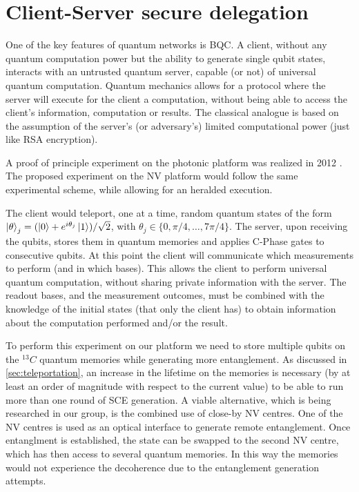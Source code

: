 \documentclass[a4paper, twoside]{article}
\begin{document}
\section{Client-Server secure delegation}
\label{sec:delegation}

One of the key features of quantum networks is \ac{BQC}. A client, without any quantum computation power but the ability to generate single qubit states, interacts with an untrusted quantum server, capable (or not) of universal quantum computation. Quantum mechanics allows for a protocol where the server will execute for the client a computation, without being able to access the client's information, computation or results. The classical analogue is based on the assumption of the server's (or adversary's) limited computational power (just like RSA encryption).

A proof of principle experiment on the photonic platform was realized in 2012 \cite{Barz2012}. The proposed experiment on the NV platform would follow the same experimental scheme, while allowing for an heralded execution.

The client would teleport, one at a time, random quantum states of the form $\ket\theta_j = (\ket 0 + e^{i \theta_j}\ket 1)/\sqrt 2$, with $\theta_j \in \lbrace0, \pi/4,\ldots,7\pi/4\rbrace$. The server, upon receiving the qubits, stores them in quantum memories and applies C-Phase gates to consecutive qubits.
At this point the client will communicate which measurements to perform (and in which bases). This allows the client to perform universal quantum computation, without sharing private information with the server. The readout bases, and the measurement outcomes, must be combined with the knowledge of the initial states (that only the client has) to obtain information about the computation performed and/or the result.

To perform this experiment on our platform we need to store multiple qubits on the ${}^{13}C$ quantum memories while generating more entanglement. As discussed in \autoref{sec:teleportation}, an increase in the lifetime on the memories is necessary (by at least an order of magnitude with respect to the current value) to be able to run more than one round of \ac{SCE} generation. 
A viable alternative, which is being researched in our group, is the combined use of close-by NV centres. One of the NV centres is used as an optical interface to generate remote entanglement. Once entanglment is established, the state can be swapped to the second NV centre, which has then access to several quantum memories. In this way the memories would not experience the decoherence due to the entanglement generation attempts.
\end{document}
